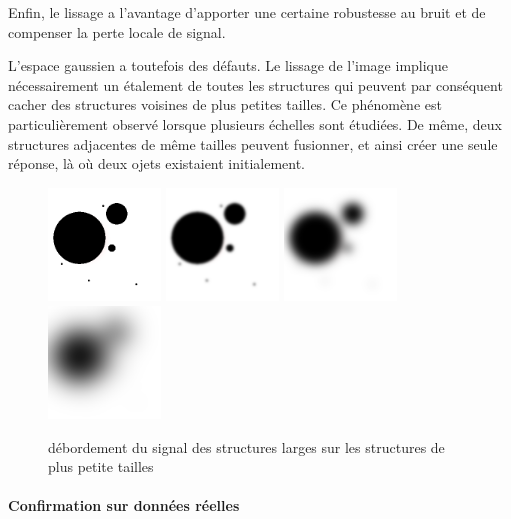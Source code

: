 Enfin, le lissage a l'avantage d'apporter une certaine robustesse au bruit et de compenser la perte locale de signal.

L'espace gaussien a toutefois des défauts. Le lissage de l'image implique nécessairement un étalement de toutes les structures qui peuvent par conséquent cacher des structures voisines de plus petites tailles. Ce phénomène est particulièrement observé lorsque plusieurs échelles sont étudiées. De même, deux structures adjacentes de même tailles peuvent fusionner, et ainsi créer une seule réponse, là où deux ojets existaient initialement.

\begin{figure}
  \centering
  \includegraphics[height=3cm]{Images/gaussian_spilling_init.png}
  \includegraphics[height=3cm]{Images/gaussian_spilling_g10.png}
  \includegraphics[height=3cm]{Images/gaussian_spilling_g40.png}
  \includegraphics[height=3cm]{Images/gaussian_spilling_g100.png}
  \label{fig:scale_space_spilling}
  \caption{débordement du signal des structures larges sur les structures de plus petite tailles}
\end{figure}



\paragraph{Confirmation sur données réelles}

